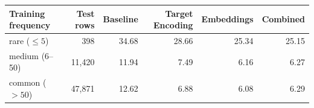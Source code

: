 \begin{tabular}{lrrrrr}
\toprule
Training frequency & Test rows & Baseline & Target Encoding & Embeddings & Combined \\
\midrule
rare ($\le 5$) & 398 & 34.68 & 28.66 & 25.34 & 25.15 \\
medium (6--50) & 11,420 & 11.94 & 7.49 & 6.16 & 6.27 \\
common ($>50$) & 47,871 & 12.62 & 6.88 & 6.08 & 6.29 \\
\bottomrule
\end{tabular}
